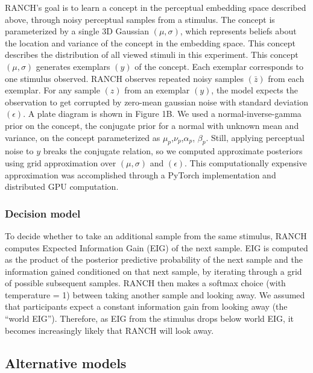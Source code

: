 \documentclass[10pt, letterpaper]{article}
\begin{document}
RANCH's goal is to learn a concept in the perceptual embedding space
described above, through noisy perceptual samples from a stimulus. The
concept is parameterized by a single 3D Gaussian \((\mu,\sigma)\), which
represents beliefs about the location and variance of the concept in the
embedding space. This concept describes the distribution of all viewed
stimuli in this experiment. This concept \((\mu,\sigma)\) generates
exemplars \((y)\) of the concept. Each exemplar corresponds to one
stimulus observed. RANCH observes repeated noisy samples \((\bar{z})\)
from each exemplar. For any sample \((z)\) from an exemplar \((y)\), the
model expects the observation to get corrupted by zero-mean gaussian
noise with standard deviation \((\epsilon)\). A plate diagram is shown
in Figure 1B. We used a normal-inverse-gamma prior on the concept, the
conjugate prior for a normal with unknown mean and variance, on the
concept parameterized as \(\mu_{p}\),\(\nu_{p}\),\(\alpha_{p}\),
\(\beta_{p}\). Still, applying perceptual noise to \(y\) breaks the
conjugate relation, so we computed approximate posteriors using grid
approximation over \((\mu,\sigma)\) and \((\epsilon)\). This
computationally expensive approximation was accomplished through a
PyTorch implementation and distributed GPU computation.

\hypertarget{decision-model}{%
\subsubsection{Decision model}\label{decision-model}}

To decide whether to take an additional sample from the same stimulus,
RANCH computes Expected Information Gain (EIG) of the next sample. EIG
is computed as the product of the posterior predictive probability of
the next sample and the information gained conditioned on that next
sample, by iterating through a grid of possible subsequent samples.
RANCH then makes a softmax choice (with temperature = 1) between taking
another sample and looking away. We assumed that participants expect a
constant information gain from looking away (the ``world EIG'').
Therefore, as EIG from the stimulus drops below world EIG, it becomes
increasingly likely that RANCH will look away.

\hypertarget{alternative-models}{%
\subsection{Alternative models}\label{alternative-models}}
\end{document}
